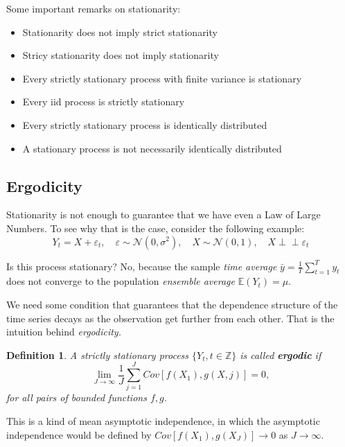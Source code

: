 \documentclass[11pt, a4paper]{report}
\newcommand{\indep}{\perp \!\!\! \perp}
\theoremstyle{plain}
\theoremstyle{plain}
\newtheorem{defn}{Definition}[section]
\theoremstyle{remark}
\begin{document}
\vspace{1em}

Some important remarks on stationarity: 
\begin{itemize}
	\item Stationarity does not imply strict stationarity
	\item Stricy stationarity does not imply stationarity
	\item Every strictly stationary process with finite variance is stationary
	\item Every iid process is strictly stationary
	\item Every strictly stationary process is identically distributed
	\item A stationary process is not necessarily identically distributed
\end{itemize}

\subsection{Ergodicity}

Stationarity is not enough to guarantee that we have even a Law of Large Numbers. To see why that is the case, consider the following example:
$$ Y_t = X + \varepsilon_t, \hspace{1em} \varepsilon \sim \mathcal{N}(0, \sigma^2), \hspace{1em} X \sim \mathcal{N}(0,1), \hspace{1em} X \indep \varepsilon_t $$

Is this process stationary? No, because the sample \textit{time average} $\bar{y} = \frac{1}{T}\sum_{t=1}^T y_t$ does not converge to the population \textit{ensemble average} $\mathbb{E}(Y_t) = \mu$.

We need some condition that guarantees that the dependence structure of the time series decays as the observation get further from each other. That is the intuition behind \textit{ergodicity.}

\begin{defn}
	A strictly stationary process $\{Y_t, t \in \mathbb{Z} \}$ is called \textbf{ergodic} if
	$$ \lim_{J \rightarrow \infty} \dfrac{1}{J} \sum_{j=1}^J Cov[f(X_1), g(X,j)] = 0, $$
	for all pairs of bounded functions $f, g$.
\end{defn}

This is a kind of mean asymptotic independence, in which the asymptotic independence would be defined by $Cov[f(X_1), g(X_J)] \rightarrow 0$ as $J \rightarrow \infty$. 
\end{document}
